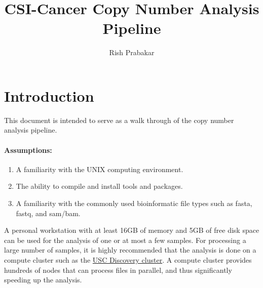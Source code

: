 \documentclass[11pt]{article}
\title{CSI-Cancer Copy Number Analysis Pipeline}
\author{Rish Prabakar}
\begin{document}
\maketitle

\section{Introduction}
This document is intended to serve as a walk through of the copy number
analysis pipeline.

\paragraph{Assumptions:}
\begin{enumerate}
  \item A familiarity with the UNIX computing environment.
  \item The ability to compile and install tools and packages.
  \item A familiarity with the commonly used bioinformatic file types such
    as fasta, fastq, and sam/bam.
\end{enumerate}

A personal workstation with at least 16GB of memory and 5GB of free disk
space can be used for the analysis of one or at most a few samples.
%
For processing a large number of samples, it is highly recommended that
the analysis is done on a compute cluster such as the
\href{https://carc.usc.edu/}{USC Discovery cluster}. A compute cluster
provides hundreds of nodes that can process files in parallel, and thus
significantly speeding up the analysis.


\end{document}
